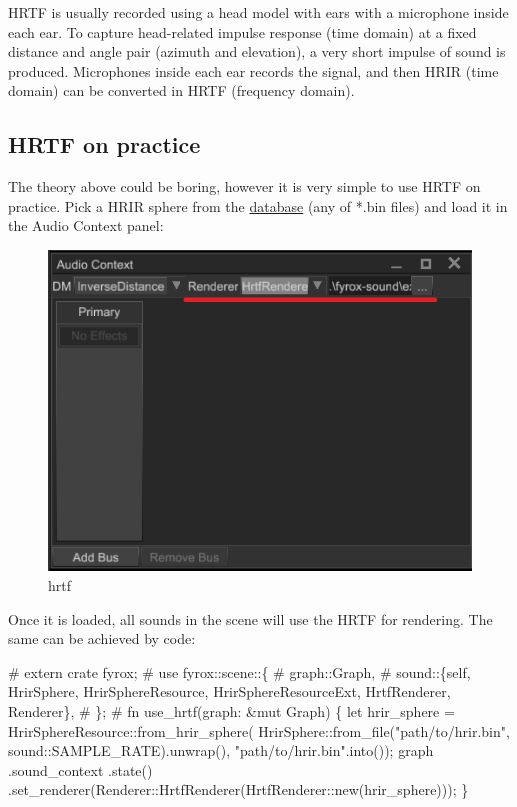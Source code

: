 \documentclass[
]{book}
\newenvironment{Shaded}{\begin{snugshade}}{\end{snugshade}}
\newcommand{\NormalTok}[1]{#1}
\theoremstyle{definition}
\theoremstyle{definition}
\theoremstyle{definition}
\theoremstyle{definition}
\theoremstyle{remark}
\begin{document}
HRTF is usually recorded using a head model with ears with a microphone inside each ear. To capture head-related impulse response (time domain) at a fixed distance and angle pair (azimuth and elevation), a very short impulse of sound is produced. Microphones inside each ear records the signal, and then HRIR (time domain) can be converted in HRTF (frequency domain).

\subsection{HRTF on practice}\label{hrtf-on-practice}

The theory above could be boring, however it is very simple to use HRTF on practice. Pick a HRIR sphere from the \href{https://github.com/mrDIMAS/hrir_sphere_builder/tree/master/hrtf_base/IRCAM}{database} (any of *.bin files) and load it in the Audio Context panel:

\begin{figure}
\centering
\includegraphics{images/sound_hrtf.png}
\caption{hrtf}
\end{figure}

Once it is loaded, all sounds in the scene will use the HRTF for rendering. The same can be achieved by code:

\begin{Shaded}
\begin{Highlighting}[]
\NormalTok{\# extern crate fyrox;}
\NormalTok{\# use fyrox::scene::\{}
\NormalTok{\#     graph::Graph,}
\NormalTok{\#     sound::\{self, HrirSphere, HrirSphereResource, HrirSphereResourceExt, HrtfRenderer, Renderer\},}
\NormalTok{\# \};}
\NormalTok{\# }
\NormalTok{fn use\_hrtf(graph: \&mut Graph) \{}
\NormalTok{    let hrir\_sphere = HrirSphereResource::from\_hrir\_sphere(}
\NormalTok{        HrirSphere::from\_file("path/to/hrir.bin", sound::SAMPLE\_RATE).unwrap(), "path/to/hrir.bin".into());}
\NormalTok{    graph}
\NormalTok{        .sound\_context}
\NormalTok{        .state()}
\NormalTok{        .set\_renderer(Renderer::HrtfRenderer(HrtfRenderer::new(hrir\_sphere)));}
\NormalTok{\}}
\end{Highlighting}
\end{Shaded}
\end{document}
